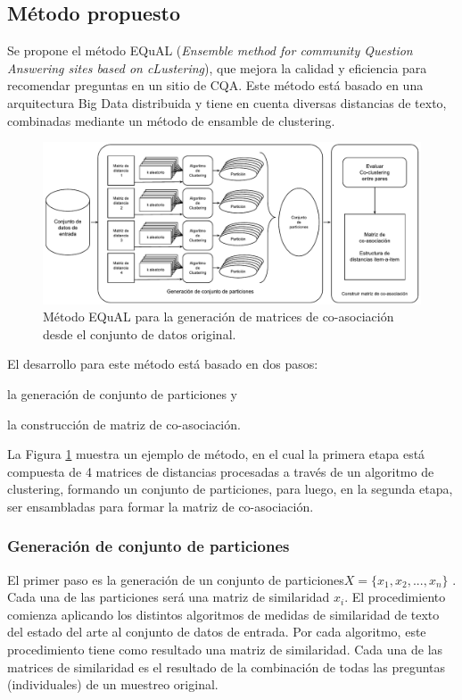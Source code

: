 \subsection{Método propuesto}
Se propone el método EQuAL (\textit{Ensemble method for community Question Answering sites based on cLustering}), que mejora la calidad y eficiencia para recomendar preguntas en un sitio de CQA. Este método está basado en una arquitectura Big Data distribuida y tiene en cuenta diversas distancias de texto, combinadas mediante un método de ensamble de clustering.

\begin{figure}[h!]
	\centering
	\includegraphics[width=0.9\linewidth]{8_problema_investigacion/imagenes/metodo_equal}
	\caption{Método EQuAL para la generación de matrices de co-asociación desde el conjunto de datos original.}
	\label{fig:metodoequal}
\end{figure}

El desarrollo para este método está basado en dos pasos: \begin{enumerate*} [label=(\roman*)] \item la generación de conjunto de particiones y \item la construcción de matriz de co-asociación. \end{enumerate*} La Figura \ref{fig:metodoequal} muestra un ejemplo de método, en el cual la primera etapa está compuesta de 4 matrices de distancias procesadas a través de un algoritmo de clustering, formando un conjunto de particiones, para luego, en la segunda etapa, ser ensambladas para formar la matriz de co-asociación.


\subsubsection{Generación de conjunto de particiones}
El primer paso es la generación de un conjunto de particiones\(X = \{x_1, x_2,... , x_n\}\) . Cada una de las particiones será una matriz de similaridad \(x_i\). El procedimiento comienza aplicando los distintos algoritmos de medidas de similaridad de texto del estado del arte al conjunto de datos de entrada. Por cada algoritmo, este procedimiento tiene como resultado una matriz de similaridad. Cada una de las matrices de similaridad es el resultado de la combinación de todas las preguntas (individuales) de un muestreo original.

